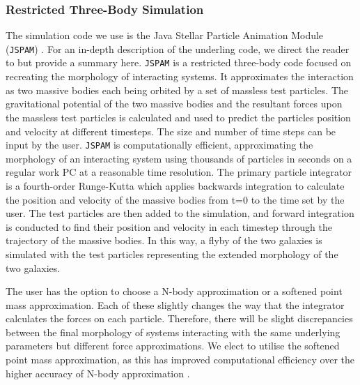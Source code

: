 \subsubsection{Restricted Three-Body Simulation}\label{sec:apyspam}
The simulation code we use is the Java Stellar Particle Animation Module (\texttt{JSPAM}) \citep{2016A&C....16...26W}. For an in-depth description of the underling code, we direct the reader to \citet{1990AJ....100.1477W,2016A&C....16...26W} but provide a summary here. \texttt{JSPAM} is a restricted three-body code focused on recreating the morphology of interacting systems. It approximates the interaction as two massive bodies each being orbited by a set of massless test particles. The gravitational potential of the two massive bodies and the resultant forces upon the massless test particles is calculated and used to predict the particles position and velocity at different timesteps. The size and number of time steps can be input by the user. \texttt{JSPAM} is computationally efficient, approximating the morphology of an interacting system using thousands of particles in seconds on a regular work PC at a reasonable time resolution. The primary particle integrator is a fourth-order Runge-Kutta which applies backwards integration to calculate the position and velocity of the massive bodies from t=0 to the time set by the user. The test particles are then added to the simulation, and forward integration is conducted to find their position and velocity in each timestep through the trajectory of the massive bodies. In this way, a flyby of the two galaxies is simulated with the test particles representing the extended morphology of the two galaxies. 

The user has the option to choose a N-body approximation or a softened point mass approximation. Each of these slightly changes the way that the integrator calculates the forces on each particle. Therefore, there will be slight discrepancies between the final morphology of systems interacting with the same underlying parameters but different force approximations. We elect to utilise the softened point mass approximation, as this has improved computational efficiency over the higher accuracy of N-body approximation \citep[for more on this see][]{2016A&C....16...26W}. 

